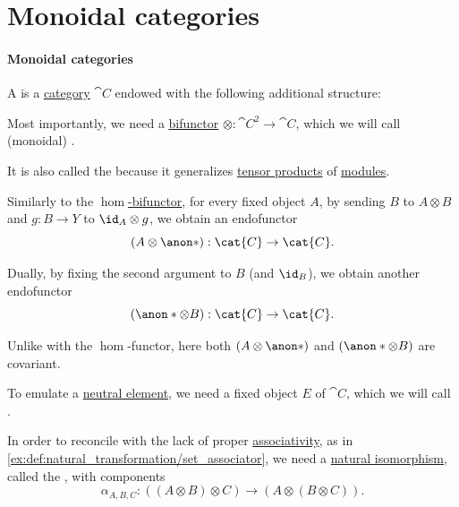 \section{Monoidal categories}\label{sec:monoidal_categories}

\paragraph{Monoidal categories}

\begin{definition}\label{def:monoidal_category}
  A  is a \hyperref[def:category]{category} \( \cat{C} \) endowed with the following additional structure:
  \begin{thmenum}[series=def:monoidal_category]
     Most importantly, we need a \hyperref[def:bifunctor]{bifunctor} \( {\otimes}: \cat{C}^2 \to \cat{C} \), which we will call (monoidal) .

    It is also called the  because it generalizes \hyperref[def:module_tensor_product]{tensor products} of \hyperref[def:module]{modules}.

    Similarly to the \hyperref[def:hom_bifunctor]{\( \hom \)-bifunctor}, for every fixed object \( A \), by sending \( B \) to \( A \otimes B \) and \( g: B \to Y \) to \( \id_A \otimes g \), we obtain an endofunctor
    \begin{equation*}
      (A \otimes \anon*): \cat{C} \to \cat{C}.
    \end{equation*}

    Dually, by fixing the second argument to \( B \) (and \( \id_B \)), we obtain another endofunctor
    \begin{equation*}
      (\anon* \otimes B): \cat{C} \to \cat{C}.
    \end{equation*}

    Unlike with the \( \hom \)-functor, here both \( (A \otimes \anon*) \) and \( (\anon* \otimes B) \) are covariant.

     To emulate a \hyperref[def:semigroup_neutral_element]{neutral element}, we need a fixed object \( E \) of \( \cat{C} \), which we will call .

     In order to reconcile with the lack of proper \hyperref[def:binary_operation/associative]{associativity}, as in \cref{ex:def:natural_transformation/set_associator}, we need a \hyperref[def:natural_isomorphism]{natural isomorphism}, called the , with components
    \begin{equation*}
      \alpha_{A,B,C}: ((A \otimes B) \otimes C) \to (A \otimes (B \otimes C)).
    \end{equation*}


\end{thmenum}
\end{definition}
